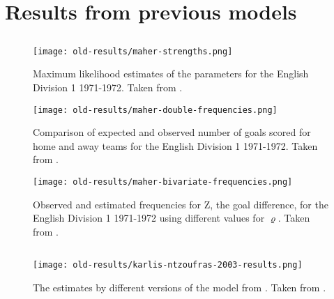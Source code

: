 \chapter{Results from previous models}

\section{\citet{bib:maher-1982}}

\begin{figure}
    \centering
    \texttt{[image: old-results/maher-strengths.png]}
    \caption{Maximum likelihood estimates of the parameters for the English Division 1 1971-1972. Taken from \citet{bib:maher-1982}.}
    \label{fig:app-maher-strengths}
\end{figure}

\begin{figure}
    \centering
    \texttt{[image: old-results/maher-double-frequencies.png]}
    \caption{Comparison of expected and observed number of goals scored for home and away teams for the English Division 1 1971-1972. Taken from \citet{bib:maher-1982}.}
    \label{fig:app-maher-double-frequencies}
\end{figure}

\begin{figure}
    \centering
    \texttt{[image: old-results/maher-bivariate-frequencies.png]}
    \caption{Observed and estimated frequencies for Z, the goal difference, for the English Division 1 1971-1972 using different values for $\varrho$. Taken from \citet{bib:maher-1982}.}
    \label{fig:app-maher-bivariate-frequencies}
\end{figure}


\section{\citet{bib:karlis-ntzoufras-2003}}

\begin{figure}
    \centering
    \texttt{[image: old-results/karlis-ntzoufras-2003-results.png]}
    \caption{The estimates by different versions of the model from \citet{bib:karlis-ntzoufras-2003}. Taken from \citet{bib:karlis-ntzoufras-2003}.}
    \label{fig:app-karlis-ntzoufras-2003-results}
\end{figure}


\section{\citet{bib:koopman-lit-2015}}

